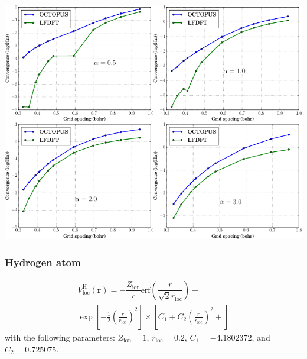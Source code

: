 \documentclass[10pt]{beamer}
\begin{document}
\begin{frame}[plain]

{\centering
\includegraphics[width=\textwidth]{images/COMBINE_v1.pdf}
}

\end{frame}



\begin{frame}
\frametitle{Hydrogen atom}

\begin{multline}
  V^{\mathrm{H}}_{\mathrm{loc}}(\mathbf{r}) = 
  -\dfrac{Z_{\mathrm{ion}}}{r}
  \mathrm{erf}\left(
  \dfrac{r}{\sqrt{2}r_{\mathrm{loc}}}
  \right) + \\
  \exp
  \left[ -\frac{1}{2}
  \left( \frac{r}{r_{\mathrm{loc}}}\right)^2
  \right]
  \times
  \left[
  C_{1} +
  C_{2}\left( \frac{r}{r_{\mathrm{loc}}}\right)^2 +
\right]
\end{multline}
with the following parameters:
$Z_{\mathrm{ion}} = 1$, $r_{\mathrm{loc}} = 0.2$,
$C_{1} = -4.1802372$, and $C_{2} = 0.725075$.


\end{frame}
\end{document}
